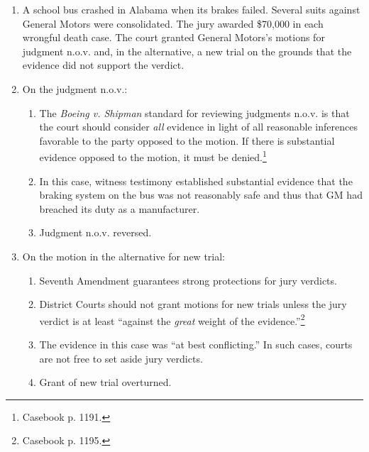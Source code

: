 \begin{enumerate}
    \item A school bus crashed in Alabama when its brakes failed. Several 
    suits against General Motors were consolidated. The jury awarded \$70,000 
    in each wrongful death case. The court granted General Motors's motions 
    for judgment n.o.v. and, in the alternative, a new trial on the grounds 
    that the evidence did not support the verdict.
    \item On the judgment n.o.v.:
    \begin{enumerate}
        \item The \emph{Boeing v. Shipman} standard for reviewing judgments 
        n.o.v. is that the court should consider \emph{all} evidence in light 
        of all reasonable inferences favorable to the party opposed to the 
        motion. If there is substantial evidence opposed to the motion, it 
        must be denied.\footnote{Casebook p. 1191.}
        \item In this case, witness testimony established substantial evidence 
        that the braking system on the bus was not reasonably safe and thus 
        that GM had breached its duty as a manufacturer.
        \item Judgment n.o.v. reversed.
    \end{enumerate}
    \item On the motion in the alternative for new trial:
    \begin{enumerate}
        \item Seventh Amendment guarantees strong protections for jury 
        verdicts.
        \item District Courts should not grant motions for new trials unless 
        the jury verdict is at least ``against the \emph{great} weight of the 
        evidence.''\footnote{Casebook p. 1195.}
        \item The evidence in this case was ``at best conflicting.'' In such 
        cases, courts are not free to set aside jury verdicts.
        \item Grant of new trial overturned.
    \end{enumerate}
\end{enumerate}
